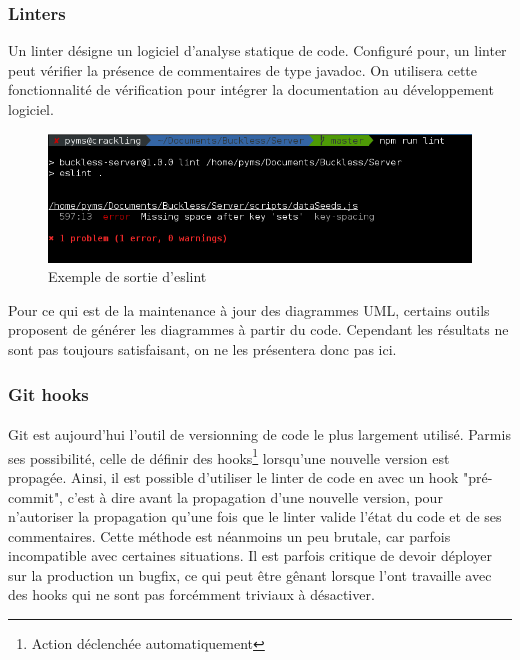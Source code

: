     \subsubsection{Linters}
        Un linter désigne un logiciel d'analyse statique de code. Configuré pour, un linter peut vérifier
        la présence de commentaires de type javadoc. On utilisera cette fonctionnalité de vérification
        pour intégrer la documentation au développement logiciel.

        \begin{figure}[ht]
            \centering
            \includegraphics[width=\textwidth]{./assets/eslint.png}
            \caption{Exemple de sortie d'eslint}
        \end{figure}

        Pour ce qui est de la maintenance à jour des diagrammes UML, certains outils proposent de générer
        les diagrammes à partir du code. Cependant les résultats ne sont pas toujours satisfaisant, on
        ne les présentera donc pas ici.

    \subsubsection{Git hooks}
        \paragraph{}
            Git est aujourd'hui l'outil de versionning de code le plus largement utilisé. Parmis ses possibilité,
            celle de définir des hooks\footnote{Action déclenchée automatiquement} lorsqu'une nouvelle version est propagée.
            Ainsi, il est possible d'utiliser le linter de code en avec un hook "pré-commit", c'est à dire avant la
            propagation d'une nouvelle version, pour n'autoriser la propagation qu'une fois que le linter valide l'état du code et
            de ses commentaires.
            Cette méthode est néanmoins un peu brutale, car parfois incompatible avec certaines situations.
            Il est parfois critique de devoir déployer sur la production un bugfix, ce qui peut être gênant lorsque l'ont travaille avec des hooks qui ne sont pas
            forcémment triviaux à désactiver.

